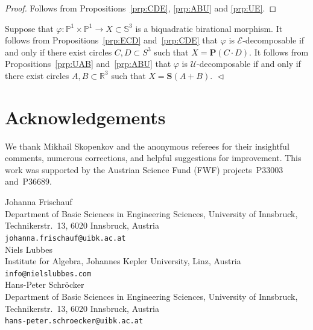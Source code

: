 \documentclass[11pt]{article}
\newcommand{\R}{\mathbb{R}}
\renewcommand{\P}{\mathbb{P}}
\renewcommand{\S}{\mathbb{S}}
\newcommand{\bP}{\mathbf{P}}
\newcommand{\bS}{\mathbf{S}}
\newcommand{\cE}{\mathcal{E}}
\newcommand{\cU}{\mathcal{U}}
\renewcommand{\c}{\colon}
\newcommand{\st}{such that }
\newcommand{\END}{\hfill $\vartriangleleft$}
\begin{document}
\begin{proof}
Follows from Propositions~\ref{prp:CDE}, \ref{prp:ABU} and \ref{prp:UE}.
\end{proof}


\begin{remark}
Suppose that $\varphi\c\P^1\times\P^1\to X\subset \S^3$ is a biquadratic birational morphism.
It follows from Propositions~\ref{prp:ECD} and~\ref{prp:CDE}
that $\varphi$ is $\cE$-decomposable if and only if
there exist circles $C,D\subset S^3$ \st $X=\bP(C\cdot D)$.
It follows from Propositions~\ref{prp:UAB} and~\ref{prp:ABU}
that $\varphi$ is $\cU$-decomposable if and only if
there exist circles $A,B\subset\R^3$ \st $X=\bS(A+B)$.
\END
\end{remark}

\section*{Acknowledgements}

We thank Mikhail Skopenkov and the anonymous referees for their insightful comments,
numerous corrections, and helpful suggestions for improvement.
This work was supported by the Austrian Science Fund (FWF)
projects~P33003 and~P36689.




Johanna Frischauf
\\Department of Basic Sciences in Engineering Sciences, University of Innsbruck,
\\Technikerstr.~13, 6020 Innsbruck, Austria
\\\texttt{johanna.frischauf@uibk.ac.at}
\\[2mm]Niels Lubbes
\\Institute for Algebra, Johannes Kepler University, Linz, Austria
\\\texttt{info@nielslubbes.com}
\\[2mm]Hans-Peter Schröcker
\\Department of Basic Sciences in Engineering Sciences, University of Innsbruck,
\\Technikerstr.~13, 6020 Innsbruck, Austria
\\\texttt{hans-peter.schroecker@uibk.ac.at}
\end{document}
